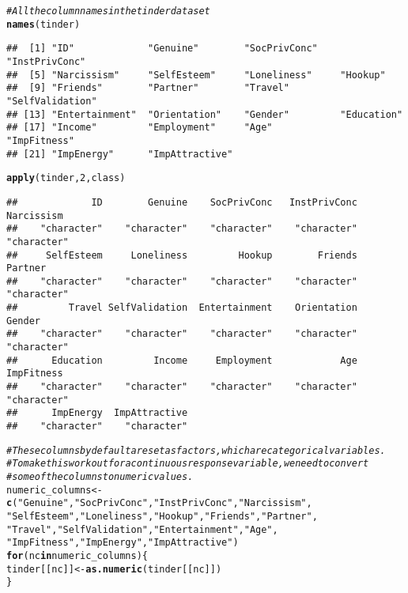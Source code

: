 \documentclass{article}\usepackage[]{graphicx}\usepackage[]{color}
\makeatletter
\newcommand{\hlnum}[1]{\textcolor[rgb]{0.686,0.059,0.569}{#1}}%
\newcommand{\hlstr}[1]{\textcolor[rgb]{0.192,0.494,0.8}{#1}}%
\newcommand{\hlcom}[1]{\textcolor[rgb]{0.678,0.584,0.686}{\textit{#1}}}%
\newcommand{\hlstd}[1]{\textcolor[rgb]{0.345,0.345,0.345}{#1}}%
\newcommand{\hlkwa}[1]{\textcolor[rgb]{0.161,0.373,0.58}{\textbf{#1}}}%
\newcommand{\hlkwb}[1]{\textcolor[rgb]{0.69,0.353,0.396}{#1}}%
\newcommand{\hlkwd}[1]{\textcolor[rgb]{0.737,0.353,0.396}{\textbf{#1}}}%
\newenvironment{kframe}{%
 \def\at@end@of@kframe{}%
 \ifinner\ifhmode%
  \def\at@end@of@kframe{\end{minipage}}%
  \begin{minipage}{\columnwidth}%
 \fi\fi%
 \def\FrameCommand##1{\hskip\@totalleftmargin \hskip-\fboxsep
 \colorbox{shadecolor}{##1}\hskip-\fboxsep
     \hskip-\linewidth \hskip-\@totalleftmargin \hskip\columnwidth}%
 \MakeFramed {\advance\hsize-\width
   \@totalleftmargin\z@ \linewidth\hsize
   \@setminipage}}%
 {\par\unskip\endMakeFramed%
 \at@end@of@kframe}
\newenvironment{knitrout}{}{} %
\makeatother
\begin{document}
\begin{knitrout}
\begin{kframe}
\begin{alltt}
\hlcom{# All the column names in the tinder dataset}
\hlkwd{names}\hlstd{(tinder)}
\end{alltt}
\begin{verbatim}
##  [1] "ID"             "Genuine"        "SocPrivConc"    "InstPrivConc"  
##  [5] "Narcissism"     "SelfEsteem"     "Loneliness"     "Hookup"        
##  [9] "Friends"        "Partner"        "Travel"         "SelfValidation"
## [13] "Entertainment"  "Orientation"    "Gender"         "Education"     
## [17] "Income"         "Employment"     "Age"            "ImpFitness"    
## [21] "ImpEnergy"      "ImpAttractive"
\end{verbatim}
\begin{alltt}
\hlkwd{apply}\hlstd{(tinder,} \hlnum{2}\hlstd{, class)}
\end{alltt}
\begin{verbatim}
##             ID        Genuine    SocPrivConc   InstPrivConc     Narcissism 
##    "character"    "character"    "character"    "character"    "character" 
##     SelfEsteem     Loneliness         Hookup        Friends        Partner 
##    "character"    "character"    "character"    "character"    "character" 
##         Travel SelfValidation  Entertainment    Orientation         Gender 
##    "character"    "character"    "character"    "character"    "character" 
##      Education         Income     Employment            Age     ImpFitness 
##    "character"    "character"    "character"    "character"    "character" 
##      ImpEnergy  ImpAttractive 
##    "character"    "character"
\end{verbatim}
\begin{alltt}
\hlcom{# These columns by default are set as factors, which are categorical variables.}
\hlcom{# To make this work out for a continuous response variable, we need to convert}
\hlcom{# some of the columns to numeric values.}
\hlstd{numeric_columns} \hlkwb{<-} \hlkwd{c}\hlstd{(}\hlstr{"Genuine"}\hlstd{,} \hlstr{"SocPrivConc"}\hlstd{,} \hlstr{"InstPrivConc"}\hlstd{,} \hlstr{"Narcissism"}\hlstd{,}
                     \hlstr{"SelfEsteem"}\hlstd{,} \hlstr{"Loneliness"}\hlstd{,} \hlstr{"Hookup"}\hlstd{,} \hlstr{"Friends"}\hlstd{,} \hlstr{"Partner"}\hlstd{,}
                     \hlstr{"Travel"}\hlstd{,} \hlstr{"SelfValidation"}\hlstd{,} \hlstr{"Entertainment"}\hlstd{,} \hlstr{"Age"}\hlstd{,}
                     \hlstr{"ImpFitness"}\hlstd{,} \hlstr{"ImpEnergy"}\hlstd{,} \hlstr{"ImpAttractive"}\hlstd{)}
\hlkwa{for} \hlstd{(nc} \hlkwa{in} \hlstd{numeric_columns) \{}
  \hlstd{tinder[[nc]]} \hlkwb{<-} \hlkwd{as.numeric}\hlstd{(tinder[[nc]])}
\hlstd{\}}


\end{alltt}
\end{kframe}
\end{knitrout}
\end{document}
